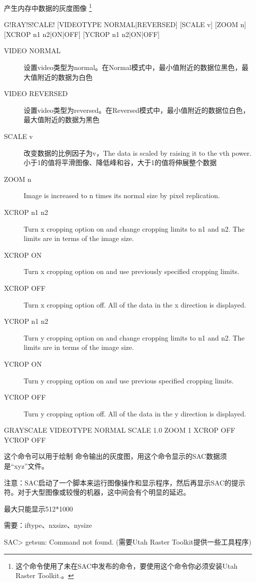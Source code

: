 \label{cmd:grayscale}

产生内存中数据的灰度图像
\footnote{
这个命令使用了未在SAC中发布的命令，要使用这个命令你必须安装Utah Raster Toolkit.。
}

\begin{SACSTX}
G!RAY!S!CALE! [VIDEOTYPE NORMAL|REVERSED] [SCALE v] [ZOOM n]
    [XCROP n1 n2|ON|OFF] [YCROP n1 n2|ON|OFF]
\end{SACSTX}

\begin{description}
\item [VIDEO NORMAL] 设置video类型为normal。在Normal模式中，最小值附近的数据位黑色，最大值附近的数据为白色
\item [VIDEO REVERSED] 设置video类型为reversed。在Reversed模式中，最小值附近的数据位白色，最大值附近的数据为黑色
\item [SCALE v] 改变数据的比例因子为v，The data is scaled by raising it to the vth power.小于1的值将平滑图像、降低峰和谷，大于1的值将伸展整个数据
\item [ZOOM n] Image is increased to n times its normal size by pixel replication.
\item [XCROP n1 n2] Turn x cropping option on and change cropping limits to n1 and n2. The limits are in terms of the image size.
\item [XCROP ON] Turn x cropping option on and use previously specified cropping limits.
\item [XCROP OFF] Turn x cropping option off.  All of the data in the x direction is displayed.
\item [YCROP n1 n2] Turn y cropping option on and change cropping limits to n1 and n2. The limits are in terms of the image size.
\item [YCROP ON] Turn y cropping option on and use previous specified cropping limits.
\item [YCROP OFF] Turn y cropping option off.  All of the data in the y direction is displayed.
\end{description}

\begin{SACDFT}
GRAYSCALE VIDEOTYPE NORMAL SCALE 1.0 ZOOM 1 XCROP OFF YCROP OFF
\end{SACDFT}

这个命令可以用于绘制  命令输出的灰度图，用这个命令显示的SAC数据须是``xyz''文件。

注意：SAC启动了一个脚本来运行图像操作和显示程序，然后再显示SAC的提示符。对于大型图像或较慢的机器，这中间会有个明显的延迟。

最大只能显示512*1000

需要：iftype、nxsize、nysize

SAC> getsun: Command not found.  (需要Utah Raster Toolkit提供一些工具程序)

